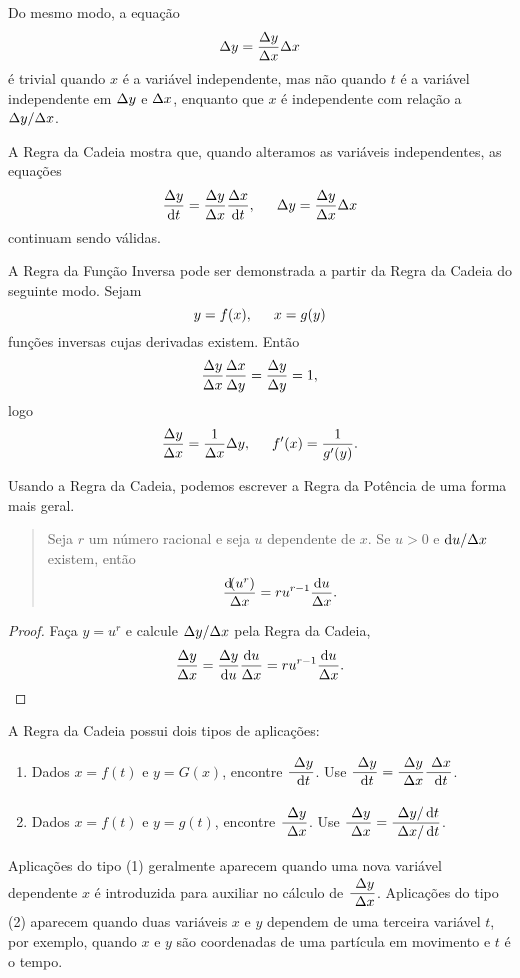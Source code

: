 Do mesmo modo, a equação
$$
  \Delta{y} = \frac{\Delta{y}}{\Delta{x}} \Delta{x}
$$
é trivial quando $x$ é a variável independente, mas não quando $t$ é a
variável independente em $\Delta{y}$ e $\Delta{x}$, enquanto que $x$ é independente
com relação a $\Delta{y}/\Delta{x}$.

A Regra da Cadeia mostra que, quando alteramos as variáveis independentes,
as equações
$$
  \frac{\dy}{\dt} = \frac{\dy}{\dx} \frac{\dx}{\dt}, \hspace{1.5em}
  \dy = \frac{\dy}{\dx} \dx
$$
continuam sendo válidas.

A Regra da Função Inversa pode ser demonstrada a partir da Regra da Cadeia
do seguinte modo. Sejam
$$
  y = f(x), \hspace{1.5em} x = g(y)
$$
funções inversas cujas derivadas existem. Então
$$
  \frac{\Delta{y}}{\Delta{x}}\frac{\Delta{x}}{\Delta{y}} = \frac{\Delta{y}}{\Delta{y}} = 1,
$$
logo
$$
  \frac{\Delta{y}}{\Delta{x}} = \frac{1}{\Delta{x}}{\Delta{y}}, \hspace{1.5em}
  f'(x) = \frac{1}{g'(y)}.
$$

Usando a Regra da Cadeia, podemos escrever a Regra da Potência de uma
forma mais geral.


\begin{quote}
Seja $r$ um número racional e seja $u$ dependente de $x$. Se $u > 0$ e
$\du/\dx$ existem, então
$$
  \frac{\dif(u^r)}{\dx} = r u^{r-1} \frac{\du}{\dx}.
$$
\end{quote}

\begin{proof} Faça $y = u^r$ e calcule $\Delta{y}/\Delta{x}$ pela Regra da Cadeia,
$$
  \frac{\dy}{\dx} = \frac{\dy}{\du} \frac{\du}{\dx} = r u^{r-1} \frac{\du}{\dx}.
$$
\end{proof}

A Regra da Cadeia possui dois tipos de aplicações:
\begin{enumerate}[(1)]
  \item Dados $x = f(t)$ e $y = G(x)$, encontre $\dsfrac{\dy}{\dt}$.
        Use $\dsfrac{\dy}{\dt} = \dsfrac{\dy}{\dx} \dsfrac{\dx}{\dt}$.
  \item Dados $x = f(t)$ e $y = g(t)$, encontre $\dsfrac{\dy}{\dx}$.
        Use $\dsfrac{\dy}{\dx} = \dsfrac{\dy/\dt}{\dx/\dt}$.
\end{enumerate}

Aplicações do tipo (1) geralmente aparecem quando uma nova variável dependente
$x$ é introduzida para auxiliar no cálculo de $\dsfrac{\dy}{\dx}$. Aplicações
do tipo (2) aparecem quando duas variáveis $x$ e $y$ dependem de uma terceira
variável $t$, por exemplo, quando $x$ e $y$ são coordenadas de uma partícula
em movimento e $t$ é o tempo.

